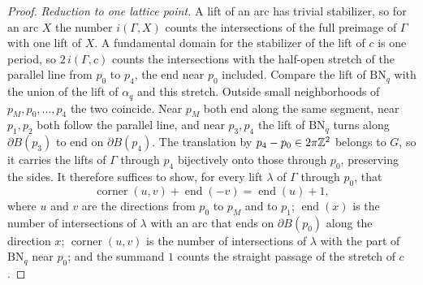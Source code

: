 \begin{proof}
\emph{Reduction to one lattice point.}  A lift of an arc has trivial stabilizer, so for an arc $X$
the number $i(\Gamma,X)$ counts the intersections of the full preimage of $\Gamma$ with one lift of $X$.  A
fundamental domain for the stabilizer of the lift of $c$ is one period, so $2\,i(\Gamma,c)$ counts the
intersections with the half-open stretch of the parallel line from $p_0$ to $p_4$, the end near $p_0$
included.  Compare the lift of $\mathrm{BN}_q$ with the union of the lift of $\alpha_q$ and this
stretch.  Outside small neighborhoods of $p_M,p_0,\dots,p_4$ the two coincide.  Near $p_M$ both end
along the same segment, near $p_1,p_2$ both follow the parallel line, and near $p_3,p_4$ the lift of
$\mathrm{BN}_q$ turns along $\partial B(p_3)$ to end on $\partial B(p_4)$.  The translation by
$p_4-p_0\in2\pi\mathbb{Z}^2$ belongs to $G$, so it carries the lifts of $\Gamma$ through $p_4$ bijectively onto
those through $p_0$, preserving the sides.  It therefore suffices to show, for every lift $\lambda$ of
$\Gamma$ through $p_0$, that
\begin{equation}\label{eq:local-identity}
 \operatorname{corner}(u,v)+\operatorname{end}(-v)=\operatorname{end}(u)+1,
\end{equation}
where $u$ and $v$ are the directions from $p_0$ to $p_M$ and to $p_1$; $\operatorname{end}(x)$ is the
number of intersections of $\lambda$ with an arc that ends on $\partial B(p_0)$ along the direction
$x$; $\operatorname{corner}(u,v)$ is the number of intersections of $\lambda$ with the part of
$\mathrm{BN}_q$ near $p_0$; and the summand $1$ counts the straight passage of the stretch of $c$.


\end{proof}
